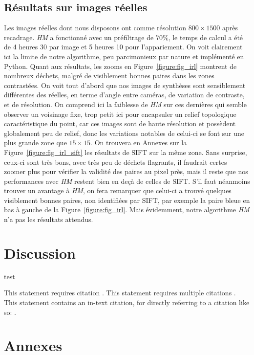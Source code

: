 \documentclass[
	a4paper, %
	10pt, %
	unnumberedsections, %
	twoside, %
]{LTJournalArticle}
\begin{document}
\subsection{Résultats sur images réelles}
Les images réelles dont nous disposons ont comme résolution $800 \times 1500$ après recadrage. \textit{HM} a fonctionné
avec un préfiltrage de $70 \%$, le temps de calcul a été de 4 heures 30 par image et 5 heures 10 pour l'appariement.
On voit clairement ici la limite de notre algorithme, peu parcimonieux par nature et implémenté en Python.
Quant aux résultats, les zooms en Figure~\ref{figure:fig_irl} montrent de nombreux déchets, malgré de visiblement
bonnes paires dans les zones contrastées.
On voit tout d'abord que nos images de synthèses sont sensiblement différentes des réelles,
en terme d'angle entre caméras, de variation de contraste, et de résolution.
On comprend ici la faiblesse de \textit{HM} sur ces dernières qui semble observer un voisinage fixe,
trop petit ici pour encapsuler un relief topologique caractéristique du point,
car ces images sont de haute résolution et possèdent globalement peu de relief, donc les
variations notables de celui-ci se font sur une plus grande zone que $15 \times 15$.
On trouvera en Annexes sur la Figure~\ref{figure:fig_irl_sift} les résultats de SIFT sur la même zone.
Sans surprise, ceux-ci sont très bons, avec très peu de déchets flagrants, il faudrait certes zoomer plus
pour vérifier la validité des paires au pixel près, mais il reste que nos performances avec \textit{HM}
restent bien en deçà de celles de SIFT. S'il faut néanmoins trouver un avantage à \textit{HM}, on fera
remarquer que celui-ci a trouvé quelques visiblement bonnes paires, non identifiées par SIFT, par
exemple la paire bleue en bas à gauche de la Figure~\ref{figure:fig_irl}.
Mais évidemment, notre algorithme \textit{HM} n'a pas les résultats attendus.


\clearpage

\section{Discussion}

test

This statement requires citation \autocite{Smith:2023qr}. This statement requires multiple citations \autocite{Smith:2023qr, Smith:2024jd}. This statement contains an in-text citation, for directly referring to a citation like so: \textcite{Smith:2024jd}.



\section{Annexes}
\end{document}
